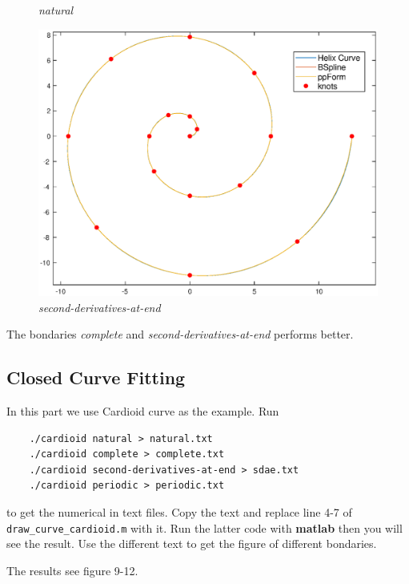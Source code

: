 \documentclass[11pt,en]{elegantpaper}
\begin{document}
\begin{figure}[htbp]
\begin{minipage}[t]{0.32\linewidth}
        \caption{\textit{natural}}
        \label{fig:side:b}
    \end{minipage}
    \begin{minipage}[t]{0.35\linewidth}
        \centering
        \includegraphics[width=0.9\linewidth]{figure/curve_helix_second-derivatives-at-end.eps}
        \caption{\textit{second-derivatives-at-end}}
        \label{fig:side:c}
    \end{minipage}%
\end{figure}

The bondaries \textit{complete} and \textit{second-derivatives-at-end} performs better.

\subsection{Closed Curve Fitting}

In this part we use Cardioid curve as the example. Run

\begin{lstlisting}
    ./cardioid natural > natural.txt
    ./cardioid complete > complete.txt
    ./cardioid second-derivatives-at-end > sdae.txt
    ./cardioid periodic > periodic.txt
\end{lstlisting}

to get the numerical in text files. Copy the text and replace line 4-7 of \verb|draw_curve_cardioid.m| with it. Run the latter code with \textbf{matlab} then you will see the result. Use the different text to get the figure of different bondaries.

The results see figure 9-12.
\end{document}
